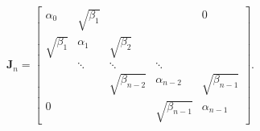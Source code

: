 \[\mathbf{J}_{n}=\begin{bmatrix}\alpha_{0}&\sqrt{\beta_{1}}&&&0\\
\sqrt{\beta_{1}}&\alpha_{1}&\sqrt{\beta_{2}}&&\\
&\ddots&\ddots&\ddots&\\
&&\sqrt{\beta_{n-2}}&\alpha_{n-2}&\sqrt{\beta_{n-1}}\\
0&&&\sqrt{\beta_{n-1}}&\alpha_{n-1}\end{bmatrix}.\]